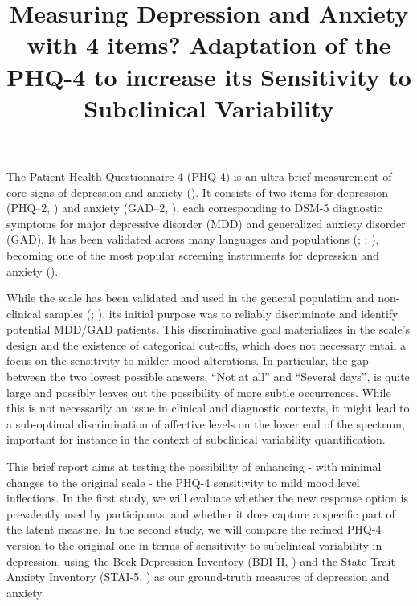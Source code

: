 \documentclass[
  jou,
  floatsintext,
  longtable,
  nolmodern,
  notxfonts,
  notimes,
  colorlinks=true,linkcolor=blue,citecolor=blue,urlcolor=blue]{apa7}
\title{\textbf{Measuring Depression and Anxiety with 4 items? Adaptation
of the PHQ-4 to increase its Sensitivity to Subclinical Variability}}
\begin{document}
\maketitle


\setcounter{secnumdepth}{-\maxdimen} %

\setlength\LTleft{0pt}

\resetlinenumber[1]

The Patient Health Questionnaire-4 (PHQ-4) is an ultra brief measurement
of core signs of depression and anxiety
(). It consists of
two items for depression (PHQ--2,
) and anxiety
(GAD--2, ), each
corresponding to DSM-5 diagnostic symptoms for major depressive disorder
(MDD) and generalized anxiety disorder (GAD). It has been validated
across many languages and populations
(; ;
), becoming one of
the most popular screening instruments for depression and anxiety
().

While the scale has been validated and used in the general population
and non-clinical samples (; ), its initial
purpose was to reliably discriminate and identify potential MDD/GAD
patients. This discriminative goal materializes in the scale's design
and the existence of categorical cut-offs, which does not necessary
entail a focus on the sensitivity to milder mood alterations. In
particular, the gap between the two lowest possible answers, ``Not at
all'' and ``Several days'', is quite large and possibly leaves out the
possibility of more subtle occurrences. While this is not necessarily an
issue in clinical and diagnostic contexts, it might lead to a
sub-optimal discrimination of affective levels on the lower end of the
spectrum, important for instance in the context of subclinical
variability quantification.

This brief report aims at testing the possibility of enhancing - with
minimal changes to the original scale - the PHQ-4 sensitivity to mild
mood level inflections. In the first study, we will evaluate whether the
new response option is prevalently used by participants, and whether it
does capture a specific part of the latent measure. In the second study,
we will compare the refined PHQ-4 version to the original one in terms
of sensitivity to subclinical variability in depression, using the Beck
Depression Inventory (BDI-II, ) and the State Trait Anxiety Inventory (STAI-5,
) as our
ground-truth measures of depression and anxiety.
\end{document}
